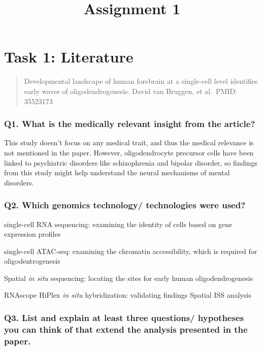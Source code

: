 \documentclass[
]{article}
\title{Assignment 1}
\author{}
\date{\vspace{-2.5em}}
\begin{document}
\maketitle

\section{Task 1: Literature}\label{task-1-literature}

\begin{quote}
Developmental landscape of human forebrain at a single-cell level
identifies early waves of oligodendrogenesis. David van Bruggen, et
al.~PMID: 35523173
\end{quote}

\subsubsection{Q1. What is the medically relevant insight from the
article?}\label{q1.-what-is-the-medically-relevant-insight-from-the-article}

This study doesn't focus on any medical trait, and thus the medical
relevance is not mentioned in the paper. However, oligodendrocyte
precursor cells have been linked to psychiatric disorders like
schizophrenia and bipolar disorder, so findings from this study might
help understand the neural mechanisms of mental disorders.

\subsubsection{Q2. Which genomics technology/ technologies were
used?}\label{q2.-which-genomics-technology-technologies-were-used}

single-cell RNA sequencing: examining the identity of cells based on
gene expression profiles

single-cell ATAC-seq: examining the chromatin accessibility, which is
required for oligodentrogenesis

Spatial \emph{in situ} sequencing: locating the sites for early human
oligodendrogenesis

RNAscope HiPlex \emph{in situ} hybridization: validating findings
Spatial ISS analysis

\subsubsection{Q3. List and explain at least three questions/ hypotheses
you can think of that extend the analysis presented in the
paper.}\label{q3.-list-and-explain-at-least-three-questions-hypotheses-you-can-think-of-that-extend-the-analysis-presented-in-the-paper.}
\end{document}
